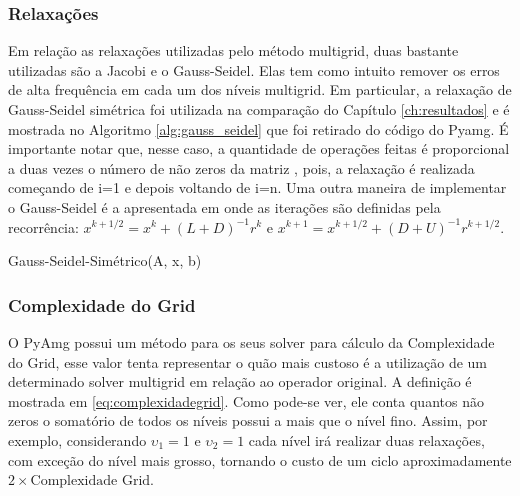 \subsubsection{Relaxações}


Em relação as relaxações utilizadas pelo método multigrid, duas bastante utilizadas são a Jacobi e o Gauss-Seidel. Elas tem como intuito remover os erros de alta frequência em cada um dos níveis multigrid. Em particular, a relaxação de Gauss-Seidel simétrica foi utilizada na comparação do Capítulo \ref{ch:resultados} e é mostrada no Algoritmo \ref{alg:gauss_seidel} que foi retirado do código do Pyamg. É importante notar que, nesse caso, a quantidade de operações feitas é proporcional a duas vezes o número de não zeros da matriz , pois, a relaxação é realizada começando de i=1 e depois voltando de i=n. Uma outra maneira de implementar o Gauss-Seidel é a apresentada em \cite{solverlinear} onde as iterações são definidas pela recorrência: $x^{k+1/2}=x^k+(L+D)^{-1}r^k$ e $x^{k+1}=x^{k+1/2}+(D+U)^{-1}r^{k+1/2}$.


\vspace{1cm}

\begin{algorithm}[H]
\caption{Gauss-Seidel-Simétrico(A, x, b)}
\label{alg:gauss_seidel}
\end{algorithm}

\vspace{1cm}


\subsubsection{Complexidade do Grid}
 
O PyAmg possui um método para os seus solver para cálculo da  Complexidade do Grid, esse valor tenta representar o quão mais custoso é a utilização de um determinado solver multigrid em relação ao operador original. A definição é mostrada em \eqref{eq:complexidadegrid}. Como pode-se ver, ele conta quantos não zeros o somatório de todos os níveis possui a mais que o nível fino. Assim, por exemplo, considerando $\upsilon_1=1$ e $\upsilon_2=1$ cada nível irá realizar duas relaxações, com exceção do nível mais grosso, tornando o  custo de um ciclo aproximadamente $2\times\text{Complexidade Grid}$. 


